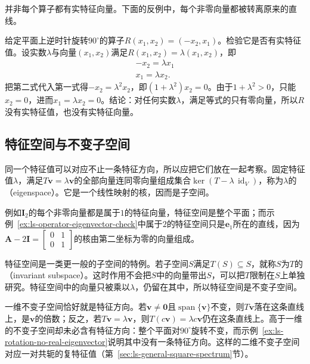 并非每个算子都有实特征向量。下面的反例中，每个非零向量都被转离原来的直线。
\begin{example}[反例：平面旋转没有实特征向量]
\label{ex:ls-rotation-no-real-eigenvector}
给定平面上逆时针旋转$90^\circ$的算子$R(x_1,x_2)=(-x_2,x_1)$。检验它是否有实特征值。设实数$\lambda$与向量$(x_1,x_2)$满足$R(x_1,x_2)=\lambda(x_1,x_2)$，即
\[
 \begin{gathered}
-x_2=\lambda x_1\\
x_1=\lambda x_2 .
 \end{gathered}
\]
把第二式代入第一式得$-x_2=\lambda^2x_2$，即$(1+\lambda^2)x_2=0$。由于$1+\lambda^2>0$，只能$x_2=0$，进而$x_1=\lambda x_2=0$。结论：对任何实数$\lambda$，满足等式的只有零向量，所以$R$没有实特征值，也没有实特征向量。
\end{example}

\subsection{特征空间与不变子空间}

同一个特征值可以对应不止一条特征方向，所以应把它们放在一起考察。固定特征值$\lambda$，满足$T\bm v=\lambda\bm v$的全部向量连同零向量组成集合$\ker(T-\lambda\,\operatorname{id}_V)$，称为$\lambda$的（eigenspace）。它是一个线性映射的核，因而是子空间。

例如$\bm I_2$的每个非零向量都是属于$1$的特征向量，特征空间是整个平面；而示例~\ref{ex:ls-operator-eigenvector-check}中属于$2$的特征空间只是$\bm e_1$所在的直线，因为$\bm A-2\bm I=\left[\begin{smallmatrix}0&1\\0&1\end{smallmatrix}\right]$的核由第二坐标为零的向量组成。

特征空间是一类更一般的子空间的特例。若子空间$S$满足$T(S)\subseteq S$，就称$S$为$T$的（invariant subspace）。这时作用不会把$S$中的向量带出$S$，可以把$T$限制在$S$上单独研究。特征空间中的向量只被乘以$\lambda$，仍留在其中，所以特征空间是不变子空间。

一维不变子空间恰好就是特征方向。若$\bm v\neq\bm0$且$\operatorname{span}\{\bm v\}$不变，则$T\bm v$落在这条直线上，是$\bm v$的倍数；反之，若$T\bm v=\lambda\bm v$，则$T(c\bm v)=\lambda c\bm v$仍在这条直线上。高于一维的不变子空间却未必含有特征方向：整个平面对$90^\circ$旋转不变，而示例~\ref{ex:ls-rotation-no-real-eigenvector}说明其中没有一条特征方向。这样的二维不变子空间对应一对共轭的复特征值（第~\ref{sec:ls-general-square-spectrum}节）。

